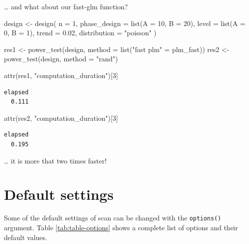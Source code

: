\documentclass[
]{book}
\newenvironment{Shaded}{\begin{snugshade}}{\end{snugshade}}
\newcommand{\AttributeTok}[1]{\textcolor[rgb]{0.77,0.63,0.00}{#1}}
\newcommand{\DecValTok}[1]{\textcolor[rgb]{0.00,0.00,0.81}{#1}}
\newcommand{\FloatTok}[1]{\textcolor[rgb]{0.00,0.00,0.81}{#1}}
\newcommand{\FunctionTok}[1]{\textcolor[rgb]{0.00,0.00,0.00}{#1}}
\newcommand{\NormalTok}[1]{#1}
\newcommand{\OtherTok}[1]{\textcolor[rgb]{0.56,0.35,0.01}{#1}}
\newcommand{\StringTok}[1]{\textcolor[rgb]{0.31,0.60,0.02}{#1}}
\begin{document}
\ldots{} and what about our fast-glm function?

\begin{Shaded}
\begin{Highlighting}[]
\NormalTok{design }\OtherTok{\textless{}{-}} \FunctionTok{design}\NormalTok{(}
  \AttributeTok{n =} \DecValTok{1}\NormalTok{,}
  \AttributeTok{phase\_design =} \FunctionTok{list}\NormalTok{(}\AttributeTok{A =} \DecValTok{10}\NormalTok{, }\AttributeTok{B =} \DecValTok{20}\NormalTok{),}
  \AttributeTok{level =} \FunctionTok{list}\NormalTok{(}\AttributeTok{A =} \DecValTok{0}\NormalTok{, }\AttributeTok{B =} \DecValTok{1}\NormalTok{),}
  \AttributeTok{trend =} \FloatTok{0.02}\NormalTok{,}
  \AttributeTok{distribution =} \StringTok{"poisson"}
\NormalTok{)}

\NormalTok{res1 }\OtherTok{\textless{}{-}} \FunctionTok{power\_test}\NormalTok{(design, }\AttributeTok{method =} \FunctionTok{list}\NormalTok{(}\StringTok{"fast plm"} \OtherTok{=}\NormalTok{ plm\_fast))}
\NormalTok{res2 }\OtherTok{\textless{}{-}} \FunctionTok{power\_test}\NormalTok{(design, }\AttributeTok{method =} \StringTok{"rand"}\NormalTok{)}

\FunctionTok{attr}\NormalTok{(res1, }\StringTok{"computation\_duration"}\NormalTok{)[}\DecValTok{3}\NormalTok{]}
\end{Highlighting}
\end{Shaded}

\begin{verbatim}
elapsed 
  0.111 
\end{verbatim}

\begin{Shaded}
\begin{Highlighting}[]
\FunctionTok{attr}\NormalTok{(res2, }\StringTok{"computation\_duration"}\NormalTok{)[}\DecValTok{3}\NormalTok{]}
\end{Highlighting}
\end{Shaded}

\begin{verbatim}
elapsed 
  0.195 
\end{verbatim}

\ldots{} it is more that two times faster!

\hypertarget{default-settings}{%
\chapter{Default settings}\label{default-settings}}

Some of the default settings of scan can be changed with the \texttt{options()} argument. Table \ref{tab:table-options} shows a complete list of options and their default values.
\end{document}
